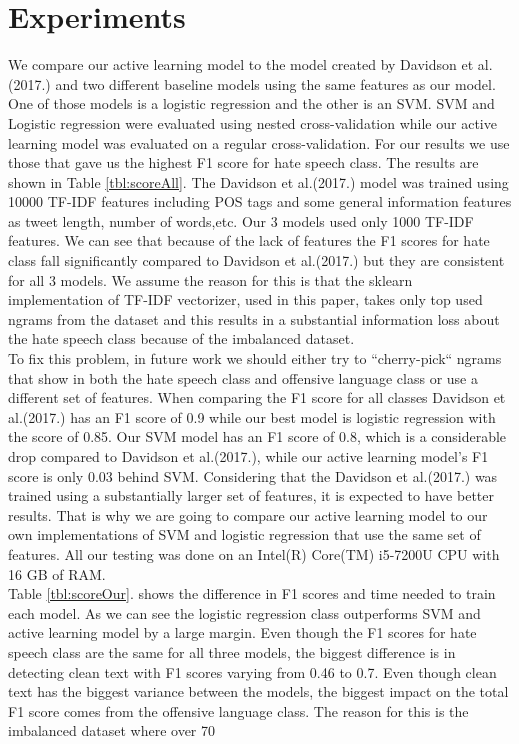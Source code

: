 \documentclass[10pt, a4paper]{article}
\begin{document}
\section{Experiments}
We compare our active learning model to the model created by Davidson et al.(2017.) and two different baseline models using the same features as our model. One of those models is a logistic regression and the other is an SVM. SVM and Logistic regression were evaluated using nested cross-validation while our active learning model was evaluated on a regular cross-validation. For our results we use those that gave us the highest F1 score for hate speech class. The results are shown in Table \ref{tbl:scoreAll}. The Davidson et al.(2017.) model was trained using 10000 TF-IDF features including POS tags and some general information features as tweet length, number of words,etc. Our 3 models used only 1000 TF-IDF features. We can see that because of the lack of features the F1 scores for hate class fall significantly compared to Davidson et al.(2017.) but they are consistent for all 3 models. We assume the reason for this is that the sklearn implementation of TF-IDF vectorizer, used in this paper, takes only top used ngrams from the dataset and this results in a substantial information loss about the hate speech class because of the imbalanced dataset.  
\\To fix this problem, in future work we should either try to “cherry-pick“ ngrams that show in both the hate speech class and offensive language class or use a different set of features. When comparing the F1 score for all classes Davidson et al.(2017.) has an F1 score of 0.9 while our best model is logistic regression with the score of 0.85. Our SVM model has an F1 score of 0.8, which is a considerable drop compared to Davidson et al.(2017.), while our active learning model's F1 score is only 0.03 behind SVM. Considering that the Davidson et al.(2017.) was trained using a substantially larger set of features, it is expected to have better results. That is why we are going to compare our active learning model to our own implementations of SVM and logistic regression that use the same set of features. All our testing was done on an Intel(R) Core(TM) i5-7200U CPU with 16 GB of RAM. 
\\Table \ref{tbl:scoreOur}. shows the difference in F1 scores and time needed to train each model. As we can see the logistic regression class outperforms SVM and active learning model by a large margin. Even though the F1 scores for hate speech class are the same for all three models, the biggest difference is in detecting clean text with F1 scores varying from 0.46 to 0.7. Even though clean text has the biggest variance between the models, the biggest impact on the total F1 score comes from the offensive language class. The reason for this is the imbalanced dataset where over 70%
\end{document}
